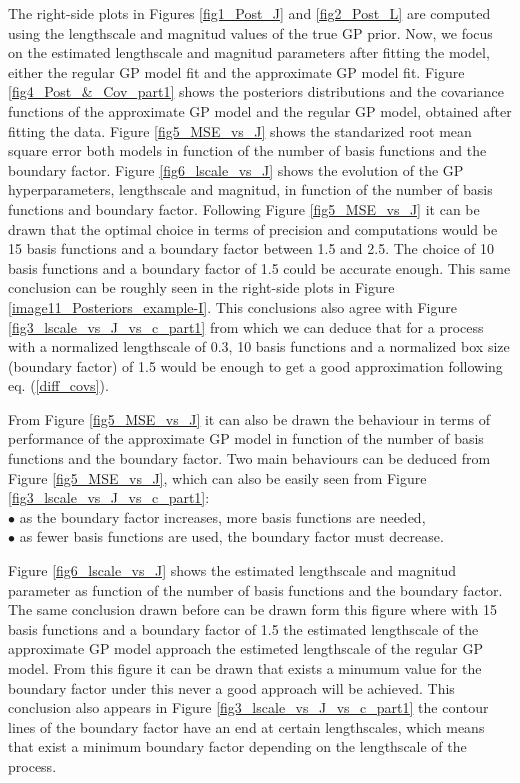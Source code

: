 \documentclass[]{interact}
\theoremstyle{plain}%
\theoremstyle{definition}
\theoremstyle{remark}
\begin{document}
The right-side plots in Figures \ref{fig1_Post_J} and \ref{fig2_Post_L} are computed using the lengthscale and magnitud values of the true GP prior. Now, we focus on the estimated lengthscale and magnitud parameters after fitting the model, either the regular GP model fit and the approximate GP model fit. Figure \ref{fig4_Post_&_Cov_part1} shows the posteriors distributions and the covariance functions of the approximate GP model and the regular GP model, obtained after fitting the data. Figure \ref{fig5_MSE_vs_J} shows the standarized root mean square error both models in function of the number of basis functions and the boundary factor. Figure \ref{fig6_lscale_vs_J} shows the evolution of the GP hyperparameters, lengthscale and magnitud, in function of the number of basis functions and boundary factor. Following Figure \ref{fig5_MSE_vs_J} it can be drawn that the optimal choice in terms of precision and computations would be 15 basis functions and a boundary factor between 1.5 and 2.5. The choice of 10 basis functions and a boundary factor of 1.5 could be accurate enough. This same conclusion can be roughly seen in the right-side plots in Figure \ref{image11_Posteriors_example-I}. This conclusions also agree with Figure \ref{fig3_lscale_vs_J_vs_c_part1} from which we can deduce that for a process with a normalized lengthscale of 0.3, 10 basis functions and a normalized box size (boundary factor) of 1.5 would be enough to get a good approximation following eq. (\ref{diff_covs}). 

From Figure \ref{fig5_MSE_vs_J} it can also be drawn the behaviour in terms of performance of the approximate GP model in function of the number of basis functions and the boundary factor. Two main behaviours can be deduced from Figure \ref{fig5_MSE_vs_J}, which can also be easily seen from Figure \ref{fig3_lscale_vs_J_vs_c_part1}:
\\ 
$\bullet$ as the boundary factor increases, more basis functions are needed,
\\
$\bullet$ as fewer basis functions are used, the boundary factor must decrease.  

Figure \ref{fig6_lscale_vs_J} shows the estimated lengthscale and magnitud parameter as function of the number of basis functions and the boundary factor. The same conclusion drawn before can be drawn form this figure where with 15 basis functions and a boundary factor of 1.5 the estimated lengthscale of the approximate GP model approach the estimeted lengthscale of the regular GP model. From this figure it can be drawn that exists a minumum value for the boundary factor under this never a good approach will be achieved. This conclusion also appears in Figure \ref{fig3_lscale_vs_J_vs_c_part1} the contour lines of the boundary factor have an end at certain lengthscales, which means that exist a minimum boundary factor depending on the lengthscale of the process. 
\end{document}

